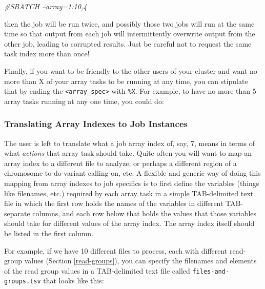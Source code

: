 \documentclass[]{krantz}
\makeatletter
\newenvironment{Shaded}{\begin{snugshade}}{\end{snugshade}}
\newcommand{\CommentTok}[1]{\textcolor[rgb]{0.37,0.37,0.37}{\textit{#1}}}
\newenvironment{kframe}{%
\medskip{}
\setlength{\fboxsep}{.8em}
 \def\at@end@of@kframe{}%
 \ifinner\ifhmode%
  \def\at@end@of@kframe{\end{minipage}}%
  \begin{minipage}{\columnwidth}%
 \fi\fi%
 \def\FrameCommand##1{\hskip\@totalleftmargin \hskip-\fboxsep
 \colorbox{shadecolor}{##1}\hskip-\fboxsep
     \hskip-\linewidth \hskip-\@totalleftmargin \hskip\columnwidth}%
 \MakeFramed {\advance\hsize-\width
   \@totalleftmargin\z@ \linewidth\hsize
   \@setminipage}}%
 {\par\unskip\endMakeFramed%
 \at@end@of@kframe}
\renewenvironment{Shaded}{\begin{kframe}}{\end{kframe}}
\makeatother
\begin{document}
\begin{Shaded}
\begin{Highlighting}[]
\CommentTok{#SBATCH --array=1:10,4}
\end{Highlighting}
\end{Shaded}

then the job will be run twice, and possibly those two jobs will run at
the same time so that output from each job will intermittently overwrite output
from the other job, leading to corrupted results. Just be careful not to
request the same task index more than once!

Finally, if you want to be friendly to the other users of your cluster
and want no more than X of your array tasks to be running at any time,
you can stipulate that by ending the \texttt{\textless{}array\_spec\textgreater{}} with \texttt{\%X}. For example,
to have no more than 5 array tasks running at any one time, you could do:

\begin{Shaded}
\end{Shaded}

\hypertarget{translating-array-indexes-to-job-instances}{%
\subsubsection{Translating Array Indexes to Job Instances}\label{translating-array-indexes-to-job-instances}}

The user is left to translate what a job array index of, say, 7, means in terms of
what \emph{actions} that array task should take. Quite often you will want to map an array
index to a different file to analyze, or perhaps a different region of a chromosome to
do variant calling on, etc. A flexible and generic way of doing this mapping from
array indexes to job specifics is to first define the variables (things like filenames, etc.)
required by each array task in a simple TAB-delimited text file in which the first row holds
the names of the variables in different TAB-separate columns, and each row below that holds
the values that those variables should take for different values of the array index. The
array index itself should be listed in the first column.

For example, if we have 10 different
files to process, each with different read-group values (Section \ref{read-groups}),
you can specify the filenames and elements of the read group values in a TAB-delimited
text file called \texttt{files-and-groups.tsv} that looks like this:
\end{document}
